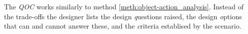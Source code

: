 \begin{method}[QOC] \label{meth:qoc} 
  The \emph{QOC} works similarly to method \ref{meth:object-action_analysis}. Instead of the trade-offs the designer lists the design \emph{q}uestions raised, the design \emph{o}ptions that can and cannot answer these, and the \emph{c}riteria establised by the scenario. \cite[p. 69]{benyon14}
\end{method}